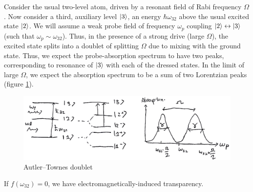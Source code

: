 Consider the usual two-level atom, driven by a resonant field of Rabi frequency $\Omega$. Now consider a third, auxiliary level $\ket{3}$, an energy $\hbar \omega_{32}$ above the usual excited state $\ket{2}$. We will assume a weak probe field of frequency $\omega_{p}$ coupling $\ket{2} \leftrightarrow \ket{3}$ (such that $\omega_{p} \sim \omega_{32}$). Thus, in the presence of a strong drive (large $\Omega$), the excited state splits into a doublet of splitting $\Omega$ due to mixing with the ground state. Thus, we expect the probe-absorption spectrum to have two peaks, corresponding to resonance of $\ket{3}$ with each of the dressed states. In the limit of large $\Omega$, we expect the absorption spectrum to be a sum of two Lorentzian peaks (figure \ref{fig:autler-townes-doublet}).
\begin{figure}[H]
	\centering
	\includegraphics[width=\textwidth]{./images/3-autler-townes-doublet}
	\caption{Autler--Townes doublet}
	\label{fig:autler-townes-doublet}
\end{figure}
If $f(\omega_{32}) = 0$, we have electromagnetically-induced transparency.

